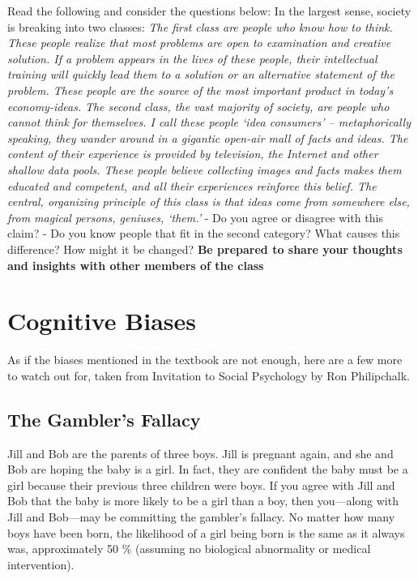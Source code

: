 \documentclass[
]{book}
\begin{document}
\begin{reflect}
Read the following and consider the questions below:
In the largest sense, society is breaking into two classes:
\emph{The first class are people who know how to think. These people realize that most problems are open to examination and creative solution. If a problem appears in the lives of these people, their intellectual training will quickly lead them to a solution or an alternative statement of the problem. These people are the source of the most important product in today's economy-ideas.}
\emph{The second class, the vast majority of society, are people who cannot think for themselves. I call these people `idea consumers' -- metaphorically speaking, they wander around in a gigantic open-air mall of facts and ideas. The content of their experience is provided by television, the Internet and other shallow data pools. These people believe collecting images and facts makes them educated and competent, and all their experiences reinforce this belief. The central, organizing principle of this class is that ideas come from somewhere else, from magical persons, geniuses, `them.'}
- Do you agree or disagree with this claim?
- Do you know people that fit in the second category? What causes this difference? How might it be changed?
\textbf{Be prepared to share your thoughts and insights with other members of the class}
\end{reflect}

\hypertarget{cognitive-biases}{%
\section{Cognitive Biases}\label{cognitive-biases}}

As if the biases mentioned in the textbook are not enough, here are a few more to watch out for, taken from Invitation to Social Psychology by Ron Philipchalk.

\hypertarget{the-gamblers-fallacy}{%
\subsection*{The Gambler's Fallacy}\label{the-gamblers-fallacy}}

Jill and Bob are the parents of three boys. Jill is pregnant again, and she and Bob are hoping the baby is a girl. In fact, they are confident the baby must be a girl because their previous three children were boys. If you agree with Jill and Bob that the baby is more likely to be a girl than a boy, then you---along with Jill and Bob---may be committing the gambler's fallacy. No matter how many boys have been born, the likelihood of a girl being born is the same as it always was, approximately 50 \% (assuming no biological abnormality or medical intervention).
\end{document}

